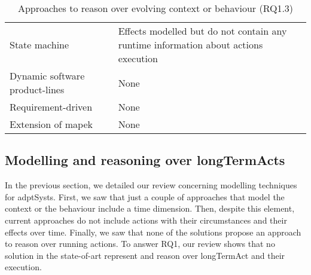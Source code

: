\begin{table}
\begin{center}
\begin{tabular}{p{}p{}p{}}
    		State machine & \cite{DBLP:conf/sigsoft/MorenoCGS15, DBLP:conf/kbse/FilieriGLM11,DBLP:conf/wetice/DjoudiBZ14, DBLP:conf/aosd/ZhangGC09, DBLP:conf/icse/GhezziPST13, DBLP:conf/kbse/TajalliGEM10} & Effects modelled but do not contain any runtime information about \glspl{action} execution \\	
    		Dynamic software product-lines & \cite{DBLP:conf/dagstuhl/GhezziS10, DBLP:series/lncs/CordyCHLS13} & None \\
    		Requirement-driven & \cite{DBLP:conf/re/BaresiPS10} & None \\
    		Extension of \gls{mapek} & \cite{DBLP:conf/iscc/MaurerBEB11} & None \\
    		\hline
    	\end{tabular}
    	\caption{Approaches to reason over evolving context or \gls{behaviour} (RQ1.3)}
    	\label{table:sota:results:actions:rq1.3}
    \end{center}
\end{table}

\subsection[Modelling and reasoning over long-term actions]{Modelling and reasoning over \glspl{longTermAct}}
In the previous section, we detailed our review concerning modelling techniques for \glspl{adptSyst}.
First, we saw that just a couple of approaches that model the context or the \gls{behaviour} include a time dimension.
Then, despite this element, current approaches do not include \glspl{action} with their circumstances and their effects over time.
Finally, we saw that none of the solutions propose an approach to reason over running actions.
To answer RQ1, our review shows that no solution in the state-of-art represent and reason over \gls{longTermAct} and their execution.












